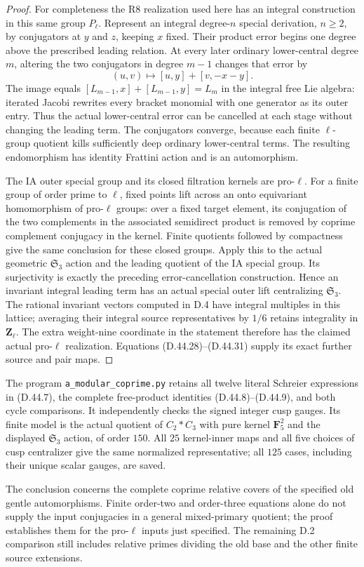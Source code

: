 \begin{proof}
For completeness the R8 realization used here has an
integral construction in this same group \(P_\ell\).
Represent an integral degree-\(n\) special derivation,
\(n\geq2\), by conjugators at \(y\) and \(z\), keeping
\(x\) fixed. Their product error begins one degree
above the prescribed leading relation.
At every later ordinary lower-central degree \(m\),
altering the two conjugators in degree \(m-1\) changes
that error by
\[
 (u,v)\longmapsto [u,y]+[v,-x-y].
 \tag{D.44.32}
\]
The image equals
\([L_{m-1},x]+[L_{m-1},y]=L_m\) in the integral
free Lie algebra: iterated Jacobi rewrites every
bracket monomial with one generator as its outer
entry. Thus the actual lower-central error can be
cancelled at each stage without changing the leading
term. The conjugators converge, because each finite
\(\ell\)-group quotient kills sufficiently deep
ordinary lower-central terms. The resulting
endomorphism has identity Frattini action and is an
automorphism.

The IA outer special group and its closed filtration
kernels are pro-\(\ell\). For a finite group of order
prime to \(\ell\), fixed points lift across an onto
equivariant homomorphism of pro-\(\ell\) groups:
over a fixed target element, its conjugation of the
two complements in the associated semidirect product
is removed by coprime complement conjugacy in the
kernel. Finite quotients followed by compactness give
the same conclusion for these closed groups.
Apply this to the actual geometric
\(\mathfrak S_3\) action and the leading quotient of
the IA special group. Its surjectivity is exactly the
preceding error-cancellation construction.
Hence an invariant integral leading term has an
actual special outer lift centralizing
\(\mathfrak S_3\).
The rational invariant vectors computed in D.4 have
integral multiples in this lattice; averaging their
integral source representatives by \(1/6\) retains
integrality in \(\mathbf Z_\ell\).
The extra weight-nine coordinate in the statement
therefore has the claimed actual pro-\(\ell\)
realization. Equations
\textup{(D.44.28)--(D.44.31)} supply its exact further
source and pair maps.
\end{proof}

The program
\texttt{a\_modular\_coprime.py}
retains all twelve literal
Schreier expressions in
\textup{(D.44.7)}, the
complete free-product
identities
\textup{(D.44.8)--(D.44.9)},
and both cycle comparisons.
It independently checks
the signed integer cusp
gauges.
Its finite model is the
actual quotient of
\(C_2*C_3\) with pure
kernel \(\mathbf F_5^2\)
and the displayed
\(\mathfrak S_3\) action,
of order \(150\).
All \(25\) kernel-inner
maps and all five choices
of cusp centralizer
give the same normalized
representative; all
\(125\) cases, including
their unique scalar
gauges, are saved.

The conclusion concerns
the complete coprime
relative covers of the
specified old gentle
automorphisms.
Finite order-two and
order-three equations
alone do not supply the
input conjugacies in a
general mixed-primary
quotient; the proof
establishes them for
the pro-\(\ell\) inputs
just specified.
The remaining D.2
comparison still includes
relative primes dividing
the old base and the
other finite source
extensions.
